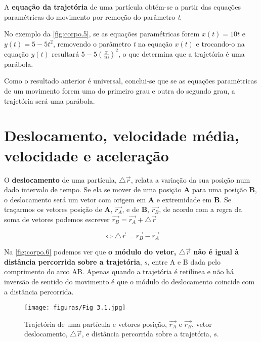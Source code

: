 \documentclass[a4paper,11pt,oneside]{report}
\begin{document}
A \textbf{equação da trajetória} de uma partícula obtém-se a partir das equações
paramétricas do movimento por remoção do parâmetro \textit{t}.

No exemplo da \autoref{fig:corpo.5}, se as equações paramétricas forem
\(x(t) = 10t\) e \(y(t) = 5-5t^2\), removendo o parâmetro \textit{t}
na equação \(x(t)\) e trocando-o na equação \(y(t)\) resultará \(5-5(\frac{x}{10} )^2\), o que
determina que a trajetória é uma parábola.

Como o resultado anterior é universal, conclui-se que se as equações paramétricas de um movimento forem uma do primeiro 
grau e outra do segundo grau, a trajetória será uma parábola.

\chapter{Deslocamento, velocidade média, velocidade e aceleração}
\label{chap.deslocamento}

O \textbf{deslocamento} de uma partícula, $\bigtriangleup\overrightarrow{r}$, relata a variação da sua posição num dado intervalo de tempo. 
Se ela se mover de uma posição \textbf{A} para uma posição \textbf{B}, o deslocamento será um vetor com origem em \textbf{A} e extremidade em \textbf{B}. 
Se traçarmos os vetores posição de \textbf{A}, $\overrightarrow{r_A}$,  e de \textbf{B}, $\overrightarrow{r_B}$,  de acordo com a regra da soma de vetores podemos escrever $\overrightarrow{r_B}=\overrightarrow{r_A}+\bigtriangleup\overrightarrow{r}$

\[
    \Leftrightarrow \bigtriangleup\overrightarrow{r}=\overrightarrow{r_B}-\overrightarrow{r_A}   
\]

Na \autoref{fig:corpo.6} podemos ver que \textbf{o módulo do vetor, $\bigtriangleup\overrightarrow{r}$  não é igual à distância percorrida sobre a trajetória}, $s$, entre A e B dada 
pelo comprimento do arco AB. Apenas quando a trajetória é retilínea e não há inversão de sentido do movimento é que o módulo 
do deslocamento coincide com a distância percorrida.

\begin{figure}[H]
    \center
    \texttt{[image: figuras/Fig 3.1.jpg]}
    \caption{Trajetória de uma partícula e vetores posição, $\overrightarrow{r_A}$ e $\overrightarrow{r_B}$, vetor deslocamento, $\bigtriangleup\overrightarrow{r}$, e distância
    percorrida sobre a trajetória, $s$.}
    \label{fig:corpo.6}
\end{figure}
\end{document}
